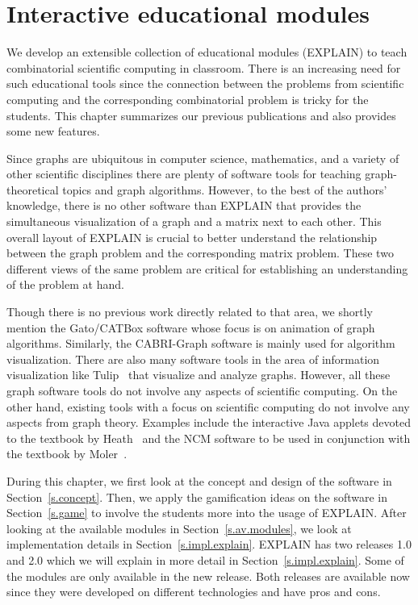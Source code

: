 \documentclass[12pt, twoside,a4paper,toc=bibliography]{scrbook}
\newcommand{\secref}[1]{Section~\protect\ref{#1}}
\begin{document}
\chapter{Interactive educational modules}
\label{explain}
We develop an extensible collection of educational modules (\mbox{EXPLAIN})
to teach combinatorial scientific computing in classroom.
There is an increasing need for such educational tools since the connection
between the problems from scientific computing and the corresponding combinatorial
problem is tricky for the students. This chapter summarizes our previous publications
\cite{2013:05,2014:01,2014:02,2014:09,2015:3} and also provides some new features.

Since graphs are ubiquitous in computer science, mathematics, and a variety of other scientific
disciplines there are plenty of software tools for teaching graph-theoretical topics and graph
algorithms. However, to the best of the authors' knowledge, there is no other software than EXPLAIN
that provides the simultaneous visualization of a graph and a matrix next to each other. This
overall layout of EXPLAIN is crucial to better understand the relationship between the graph
problem and the corresponding matrix problem. These two different views of the same problem are
critical for establishing an understanding of the problem at hand.

Though there is no previous work directly related to that area, we shortly mention the Gato/CATBox
\cite{gato2002} software whose focus is on animation of graph algorithms. Similarly, the
CABRI-Graph \cite{CABRI96} software is mainly used for algorithm visualization. There are also many
software tools in the area of information visualization like
Tulip~\cite{auber:tulip3,tulippython2012} that visualize and analyze graphs. However, all these
graph software tools do not involve any aspects of scientific computing. On the other hand,
existing tools with a focus on scientific computing do not involve any aspects from graph theory.
Examples include the interactive Java applets devoted to the textbook by Heath~\cite{MH96SCAIS} and
the NCM software to be used in conjunction with the textbook by Moler~\cite{mol:num}.

During this chapter, we first look at the concept and design of the software in
\secref{s.concept}. Then, we apply the gamification ideas on the software in
\secref{s.game} to involve the students more into the usage of \mbox{EXPLAIN}.
After looking at the available modules in \secref{s.av.modules}, we look at
implementation details in \secref{s.impl.explain}.
\mbox{EXPLAIN} has two releases 1.0 and 2.0 which we will explain in more
detail in \secref{s.impl.explain}. Some of the modules
are only available in the new release. Both releases
are available now since they were developed on different technologies and have
pros and cons.
\end{document}
